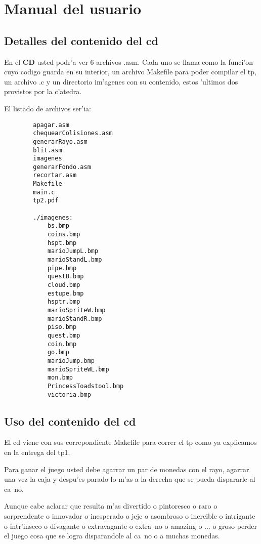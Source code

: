 \section{Manual del usuario}

\subsection{Detalles del contenido del cd}

	En el \textbf{CD} usted podr'a ver 6 archivos .asm. Cada uno se llama como
la funci'on cuyo codigo guarda en su interior, un archivo Makefile para poder
compilar el tp, un archivo .c y un directorio im'agenes con su contenido, estos
'ultimos dos provistos por la c'atedra.

	El listado de archivos ser'ia:
\begin{verbatim}
		apagar.asm     
		chequearColisiones.asm  
		generarRayo.asm 
		blit.asm 
		imagenes 
		generarFondo.asm
		recortar.asm
		Makefile
		main.c
		tp2.pdf

		./imagenes:
			bs.bmp
			coins.bmp
			hspt.bmp
			marioJumpL.bmp
			marioStandL.bmp
			pipe.bmp
			questB.bmp
			cloud.bmp
			estupe.bmp
			hsptr.bmp
			marioSpriteW.bmp
			marioStandR.bmp
			piso.bmp
			quest.bmp
			coin.bmp
			go.bmp
			marioJump.bmp
			marioSpriteWL.bmp
			mon.bmp
			PrincessToadstool.bmp
			victoria.bmp
\end{verbatim}

\subsection{Uso del contenido del cd}

El cd viene con sus correpondiente Makefile para correr el tp como ya
explicamos en la entrega del tp1.

Para ganar el juego usted debe agarrar un par de monedas con el rayo, 
agarrar una vez la caja y despu'es parado lo m'as a la derecha que 
se pueda dispararle al ca~no.

Aunque cabe aclarar que resulta m'as divertido o pintoresco o raro o 
sorprendente o innovador o inesperado o jeje o asombroso o increible o 
intrigante o intr'inseco o divagante o extravagante o extra~no o amazing
o ... o groso perder el juego cosa que se logra disparandole al ca~no o 
a muchas monedas.
